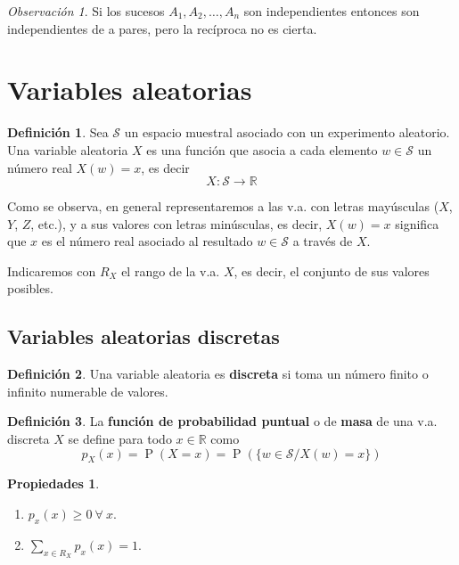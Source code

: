 \documentclass[11pt]{article}
\theoremstyle{plain}
\theoremstyle{definition}
\newtheorem*{defi}{Definición}
\newtheorem*{props}{Propiedades}
\theoremstyle{remark}
\newtheorem*{obs}{Observación}
\newcommand{\deft}[1]{\textbf{#1}}  %
\newcommand{\proba}{\ensuremath{\operatorname{P}}}  %
\newcommand{\espm}[0]{\ensuremath{\mathcal{S}}}  %
\newcommand{\foralle}{\ensuremath{\forall \ }}  %
\begin{document}
    \begin{obs}
      Si los sucesos $A_1, A_2, \dots, A_n$ son independientes entonces son independientes de a pares, pero la recíproca no es cierta.
    \end{obs}

\section{Variables aleatorias}
  \begin{defi}
    Sea $\espm$ un espacio muestral asociado con un experimento aleatorio. Una variable aleatoria $X$ es una función que asocia a cada elemento $w \in \espm$ un número real $X(w) = x$, es decir
    \[ X : \espm \to \mathbb{R} \]
  \end{defi}

    Como se observa, en general representaremos a las v.a. con letras mayúsculas ($X$, $Y$, $Z$, etc.), y a sus valores con letras minúsculas, es decir, $X(w) = x$ significa que $x$ es el número real asociado al resultado $w \in \espm$ a través de $X$.

    Indicaremos con $R_X$ el rango de la v.a. $X$, es decir, el conjunto de sus valores posibles.

  \subsection{Variables aleatorias discretas}

    \begin{defi}
      Una variable aleatoria es \deft{discreta} si toma un número finito o infinito numerable de valores.
    \end{defi}

    \begin{defi}
      La \deft{función de probabilidad puntual} o de \deft{masa} de una v.a. discreta $X$ se define para todo $x \in \mathbb{R}$ como
      \[ p_X(x) = \proba(X = x) = \proba(\lbrace w \in \espm / X(w) = x \rbrace) \]
    \end{defi}

    \begin{props} \
      \begin{enumerate}
        \item $p_x(x) \geq 0 \ \foralle x $.
        \item $\sum_{x \in R_X} p_x(x) = 1 $.
      \end{enumerate}
    \end{props}
\end{document}
